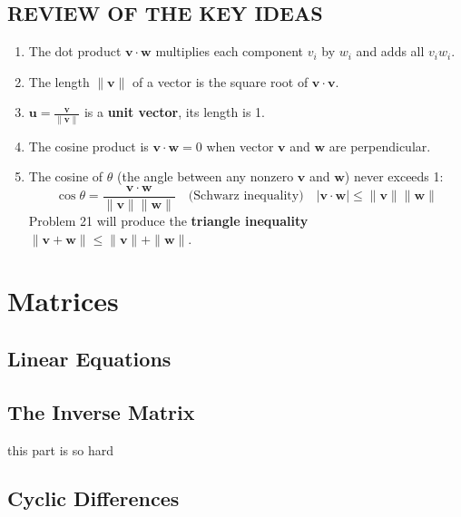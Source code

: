 \documentclass{book}
\begin{document}
\subsection*{REVIEW OF THE KEY IDEAS}
    \begin{enumerate}
        \item The dot product \( \mathbf{v} \cdot \mathbf{w} \) multiplies each component \( v_i \) by \( w_i \) and adds all \( v_i w_i \).
        \item The length \( \| \mathbf{v} \| \) of a vector is the square root of \( \mathbf{v} \cdot \mathbf{v} \).
        \item \( \mathbf{u} = \frac{\mathbf{v}}{\| \mathbf{v} \|} \) is a \textbf{unit vector}, its length is 1.
        \item The cosine product is \( \mathbf{v} \cdot \mathbf{w} = 0 \) when vector \( \mathbf{v} \) and \( \mathbf{w} \) are perpendicular.
        \item The cosine of \( \theta \) (the angle between any nonzero \( \mathbf{v} \) and \( \mathbf{w} \)) never exceeds 1: \\
        \[
        \cos \theta = \frac{\mathbf{v} \cdot \mathbf{w}}{\| \mathbf{v} \| \| \mathbf{w} \|} \quad \text{(Schwarz inequality)} \quad | \mathbf{v} \cdot \mathbf{w} | \leq \| \mathbf{v} \| \| \mathbf{w} \|
        \]
         Problem 21 will produce the \textbf{triangle inequality} \( \| \mathbf{v} + \mathbf{w} \| \leq \| \mathbf{v} \| + \| \mathbf{w} \| \).
    \end{enumerate}



\section{Matrices}

\subsection{Linear Equations}

\subsection{The Inverse Matrix}
this part is so hard

\subsection{Cyclic Differences}
\end{document}
